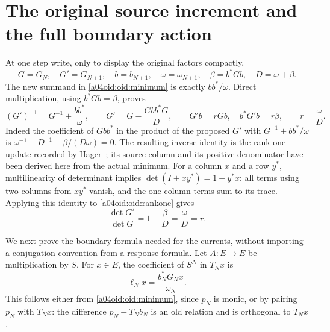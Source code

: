 \documentclass[11pt,a4paper]{article}
\begin{document}
\section{The original source increment and the full boundary action}

At one step write, only to display the original factors compactly,
\[
 G=G_N,\quad G'=G_{N+1},\quad b=b_{N+1},\quad
 \omega=\omega_{N+1},\quad \beta=b^*Gb,\quad D=\omega+\beta.
\]
The new summand in \eqref{a04oid:oid:minimum} is exactly $bb^*/\omega$.
Direct multiplication, using $b^*Gb=\beta$, proves
\begin{equation}\label{a04oid:oid:rankone}
 (G')^{-1}=G^{-1}+\frac{bb^*}{\omega},\qquad
 G'=G-\frac{Gbb^*G}{D},\qquad
 G'b=rGb,\quad b^*G'b=r\beta,
 \qquad r=\frac{\omega}{D}.
\end{equation}
Indeed the coefficient of $Gbb^*$ in the product of the proposed
$G'$ with $G^{-1}+bb^*/\omega$ is
$\omega^{-1}-D^{-1}-\beta/(D\omega)=0$.
The resulting inverse identity is the rank-one update recorded by
Hager~\cite[p.~221, equation~(2)]{a04oid:Hager}; its source column and its
positive denominator have been derived here from the actual minimum.
For a column $x$ and a row $y^*$, multilinearity of determinant
implies $\det(I+xy^*)=1+y^*x$: all terms using two columns from
$xy^*$ vanish, and the one-column terms sum to its trace.
Applying this identity to \eqref{a04oid:oid:rankone} gives
\begin{equation}\label{a04oid:oid:r}
 \frac{\det G'}{\det G}=1-\frac\beta D
 =\frac\omega D=r.
\end{equation}

We next prove the boundary formula needed for the currents, without
importing a conjugation convention from a response formula. Let $A:E\to E$
be multiplication by $S$. For $x\in E$, the coefficient of $S^N$ in
$T_Nx$ is
\begin{equation}\label{a04oid:oid:leading}
 \ell_Nx=\frac{b_N^*G_Nx}{\omega_N}.
\end{equation}
This follows either from \eqref{a04oid:oid:minimum}, since $p_N$ is monic,
or by pairing $p_N$ with $T_Nx$: the difference $p_N-T_Nb_N$
is an old relation and is orthogonal to $T_Nx$.
\end{document}
